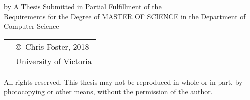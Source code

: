 \pagebreak
{
\centering
\thesistitle
\tpbreak
by
\tpbreak
\nameanddegrees
\tpbreak
A Thesis Submitted in Partial Fulfillment of the \\
Requirements for the Degree of
\tpbreak
MASTER OF SCIENCE
\tpbreak
in the Department of Computer Science\\
\vfill
\begin{tabular}{cl}
& \copyright\ Chris Foster, 2018\\
& \phantom{\copyright} University of Victoria
\end{tabular}
\tpbreak
All rights reserved. This thesis may not be reproduced in whole or in part, by \\
\hfill photocopying or other means, without the permission of the author. 
\hfill
}
\pagebreak
